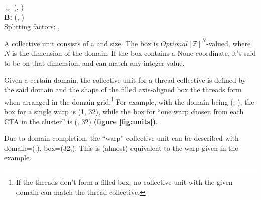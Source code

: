 $\downarrow$ {\color{grayttColor} (, )} \\
\textbf{B:} (, ) \\
Splitting factors: , 

\filbreak
{}

A collective unit consists of a  and  size.
The box is $\textit{Optional}[\mathbb{Z}]^N$-valued, where $N$ is the dimension of the domain.
If the box contains a None coordinate, it's said to be  on that dimension, and can match any integer value.

\filbreak
Given a certain domain, the collective unit for a thread collective is defined by the said domain and the shape of the filled axis-aligned box the threads form when arranged in the domain grid.\footnote{If the threads don't form a filled box, no collective unit with the given domain can match the thread collective.}
For example, with the domain being (, ), the box for a single warp is (1, 32), while the box for ``one warp chosen from each CTA in the cluster'' is (, 32) \textbf{(figure \ref{fig:units})}.

\filbreak
Due to domain completion, the ``warp'' collective unit can be described with domain=(,), box=(32,).
This is (almost) equivalent to the warp given in the example.

